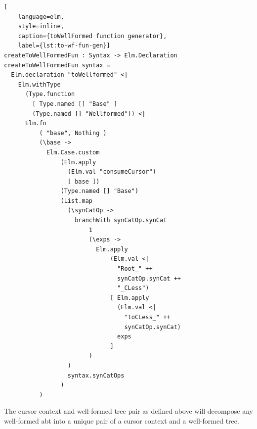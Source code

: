 \begin{lstlisting}[
    language=elm,
    style=inline,
    caption={toWellFormed function generator},
    label={lst:to-wf-fun-gen}]
createToWellFormedFun : Syntax -> Elm.Declaration
createToWellFormedFun syntax =
  Elm.declaration "toWellformed" <|
    Elm.withType 
      (Type.function 
        [ Type.named [] "Base" ] 
        (Type.named [] "Wellformed")) <|
      Elm.fn
          ( "base", Nothing )
          (\base ->
            Elm.Case.custom
                (Elm.apply 
                  (Elm.val "consumeCursor") 
                  [ base ])
                (Type.named [] "Base")
                (List.map
                  (\synCatOp ->
                    branchWith synCatOp.synCat
                        1
                        (\exps ->
                          Elm.apply
                              (Elm.val <| 
                                "Root_" ++ 
                                synCatOp.synCat ++ 
                                "_CLess")
                              [ Elm.apply 
                                (Elm.val <| 
                                  "toCLess_" ++ 
                                  synCatOp.synCat) 
                                exps 
                              ]
                        )
                  )
                  syntax.synCatOps
                )
          )
\end{lstlisting}

The cursor context and well-formed tree pair as defined above will decompose
any well-formed abt into a unique pair of a cursor context and a well-formed tree.